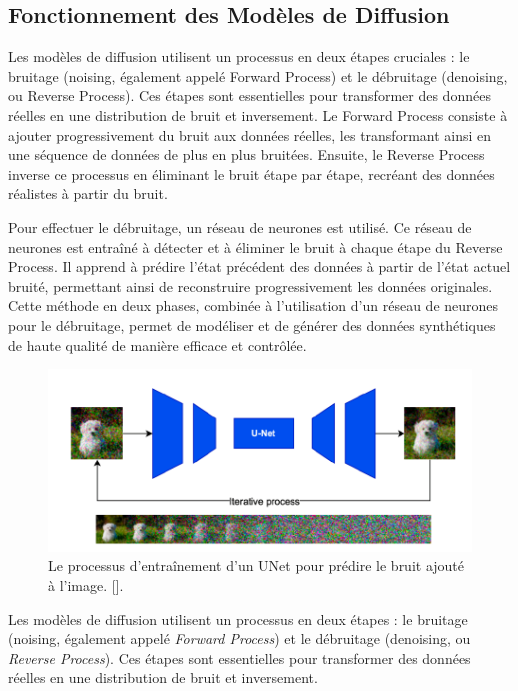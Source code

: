 \subsection{Fonctionnement des Modèles de Diffusion}

Les modèles de diffusion utilisent un processus en deux étapes cruciales : le
bruitage (noising, également appelé Forward Process) et le débruitage
(denoising, ou Reverse Process). Ces étapes sont essentielles pour transformer
des données réelles en une distribution de bruit et inversement. Le Forward
Process consiste à ajouter progressivement du bruit aux données réelles, les
transformant ainsi en une séquence de données de plus en plus bruitées.
Ensuite, le Reverse Process inverse ce processus en éliminant le bruit étape
par étape, recréant des données réalistes à partir du bruit.

Pour effectuer le débruitage, un réseau de neurones est utilisé. Ce réseau de
neurones est entraîné à détecter et à éliminer le bruit à chaque étape du
Reverse Process. Il apprend à prédire l'état précédent des données à partir de
l'état actuel bruité, permettant ainsi de reconstruire progressivement les
données originales. Cette méthode en deux phases, combinée à l'utilisation d'un
réseau de neurones pour le débruitage, permet de modéliser et de générer des
données synthétiques de haute qualité de manière efficace et contrôlée.

\begin{figure}[hbt!]
	\centering
	\includegraphics[width=12cm]{images_pfe/Unet.png}
	\caption{ Le processus d'entraînement d'un UNet pour prédire le bruit ajouté à l'image. [\cite{nichol2021improved}].}
	\label{fig:unet}
\end{figure}
\FloatBarrier

Les modèles de diffusion utilisent un processus en deux étapes : le bruitage
(noising, également appelé \textit{Forward Process}) et le débruitage
(denoising, ou \textit{Reverse Process}). Ces étapes sont essentielles pour
transformer des données réelles en une distribution de bruit et inversement.

